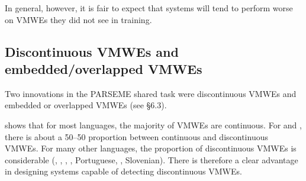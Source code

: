 \documentclass[output=paper,modfonts,nonflat,draftmode]{langsci/langscibook}
\begin{document}



 In general, however, it is fair to expect that systems will tend to perform worse on VMWEs they did not see in training.  


\subsection{Discontinuous VMWEs and embedded/overlapped VMWEs}
Two innovations in the PARSEME shared task were discontinuous VMWEs and embedded or overlapped VMWEs (see  §6.3).


 shows that for most languages, the majority of VMWEs are continuous. For  and , there is about a 50--50 proportion between continuous and discontinuous VMWEs. For many other languages, the proportion of discontinuous VMWEs is considerable (, , , , Portuguese, , Slovenian). There is therefore a clear advantage in designing systems capable of detecting discontinuous VMWEs.
\end{document}
